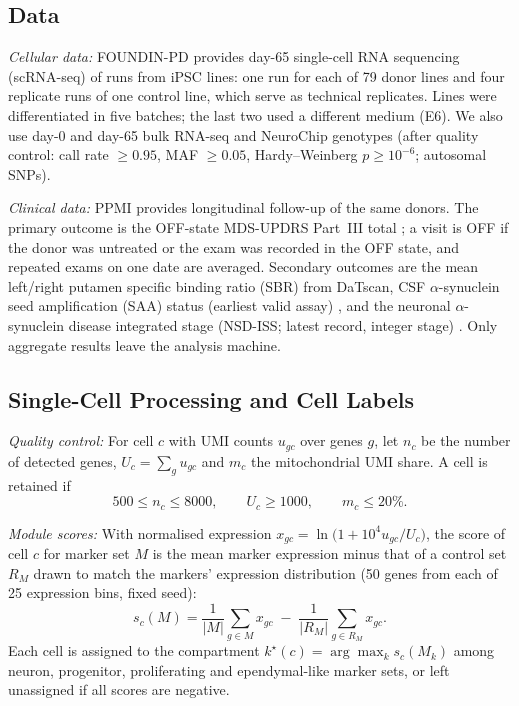\subsection{\textbf{Data}}\label{sec:data}
\emph{Cellular data:} FOUNDIN-PD \cite{bressan2023foundin} provides day-65 single-cell RNA
sequencing (scRNA-seq) of \cconeRuns{} runs from \cconeLines{} iPSC lines: one run for each of
79 donor lines and four replicate runs of one control line, which serve as technical
replicates. Lines were differentiated in five batches; the last two used a different
medium (E6). We also use day-0 and day-65 bulk RNA-seq and NeuroChip genotypes (after quality
control: call rate $\ge 0.95$, MAF $\ge 0.05$, Hardy--Weinberg $p \ge 10^{-6}$; \cctwoArraySNPs{}
autosomal SNPs).

\emph{Clinical data:} PPMI \cite{marek2011ppmi} provides longitudinal follow-up of the same donors.
The primary outcome is the OFF-state MDS-UPDRS Part~III total \cite{goetz2008mdsupdrs}; a visit is
OFF if the donor was untreated or the exam was recorded in the OFF state, and repeated exams on one
date are averaged. Secondary outcomes are the mean left/right putamen specific binding ratio (SBR)
from DaTscan, CSF $\alpha$-synuclein seed amplification (SAA) status (earliest valid assay)
\cite{siderowf2023saa}, and the neuronal $\alpha$-synuclein disease integrated stage (NSD-ISS;
latest record, integer stage) \cite{simuni2024nsdiss}. Only aggregate results leave the
analysis machine.

\subsection{\textbf{Single-Cell Processing and Cell Labels}}\label{sec:cells}
\emph{Quality control:} For cell $c$ with UMI counts $u_{gc}$ over genes $g$, let $n_c$ be the
number of detected genes, $U_c = \sum_g u_{gc}$ and $m_c$ the mitochondrial UMI share. A cell is
retained if
\begin{equation}
500 \le n_c \le 8000, \qquad U_c \ge 1000, \qquad m_c \le 20\%.
\label{eq:qc}
\end{equation}

\emph{Module scores:} With normalised expression $x_{gc} = \ln\!\big(1 + 10^4 u_{gc}/U_c\big)$, the
score of cell $c$ for marker set $M$ is the mean marker expression minus that of a
control set $R_M$ drawn to match the markers' expression distribution (50 genes from each of 25
expression bins, fixed seed):
\begin{equation}
s_c(M) = \frac{1}{|M|}\sum_{g\in M} x_{gc} \;-\; \frac{1}{|R_M|}\sum_{g\in R_M} x_{gc}.
\label{eq:score}
\end{equation}
Each cell is assigned to the compartment $k^\star(c) = \arg\max_k s_c(M_k)$ among neuron,
progenitor, proliferating and ependymal-like marker sets, or left unassigned if all scores are
negative.

